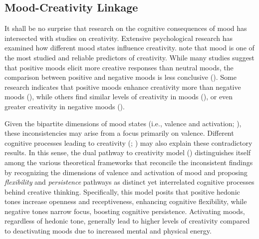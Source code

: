\documentclass[../MA_Thesis.tex]{subfiles}
\begin{document}
\subsection*{Mood-Creativity Linkage}
It shall be no surprise that research on the cognitive consequences of mood has intersected with studies on creativity. Extensive psychological research has examined how different mood states influence creativity. \textcite{de_dreu_hedonic_2008} note that mood is one of the most studied and reliable predictors of creativity. While many studies suggest that positive moods elicit more creative responses than neutral moods, the comparison between positive and negative moods is less conclusive (\cite{de_dreu_hedonic_2008}). Some research indicates that positive moods enhance creativity more than negative moods (\cite{grawitch_effects_2003}), while others find similar levels of creativity in moods (\cite{bartolic_effects_1999}), or even greater creativity in negative moods (\cite{madjar_preliminary_2002}).

Given the bipartite dimensions of mood states (i.e., valence and activation; \cite{yik_structure_1999}), these inconsistencies may arise from a focus primarily on valence. Different cognitive processes leading to creativity (\cite{finke_creative_1996}; \cite{nijstad_dual_2010}) may also explain these contradictory results. In this sense, the dual pathway to creativity model (\cite{de_dreu_hedonic_2008}) distinguishes itself among the various theoretical frameworks that reconcile the inconsistent findings by recognizing the dimensions of valence and activation of mood and proposing \textit{flexibility} and \textit{persistence} pathways as distinct yet interrelated cognitive processes behind creative thinking. Specifically, this model posits that positive hedonic tones increase openness and receptiveness, enhancing cognitive flexibility, while negative tones narrow focus, boosting cognitive persistence. Activating moods, regardless of hedonic tone, generally lead to higher levels of creativity compared to deactivating moods due to increased mental and physical energy.
\end{document}
